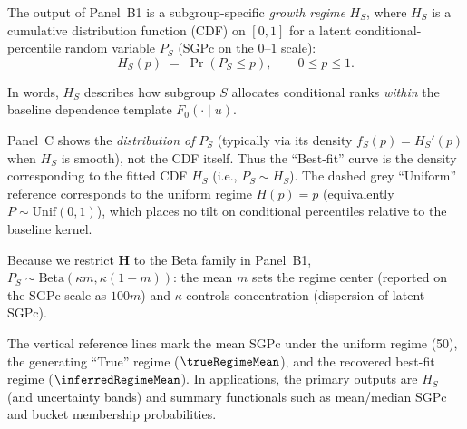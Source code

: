 \documentclass[10pt]{article}
\begin{document}
\noindent
\begin{minipage}[t]{3.75in}
  \vspace{0.05in}
  \hspace{0.15in}%
  \begin{minipage}{3.45in}
    \small\raggedright\color{bodyGrey}

    The output of Panel~B1 is a subgroup-specific \emph{growth regime} $H_S$, 
    where $H_S$ is a cumulative distribution function (CDF) on $[0,1]$ for a 
    latent conditional-percentile random variable $P_S$ (SGPc on the $0$--$1$ 
    scale):
    \[
      H_S(p)\;=\;\Pr(P_S \le p),\qquad 0\le p\le 1.
    \]
    
    \vspace{1pt}
    In words, $H_S$ describes how subgroup $S$ allocates conditional ranks 
    \emph{within} the baseline dependence template $F_0(\cdot\mid u)$.
    
    \vspace{4pt}
    Panel~C shows the \emph{distribution of} $P_S$ (typically via its density 
    $f_S(p)=H_S'(p)$ when $H_S$ is smooth), not the CDF itself. Thus the ``Best-fit'' 
    curve is the density corresponding to the fitted CDF $H_S$ (i.e., $P_S\sim H_S$).
    The dashed grey ``Uniform'' reference corresponds to the uniform regime $H(p)=p$ 
    (equivalently $P\sim\mathrm{Unif}(0,1)$), which places no tilt on conditional 
    percentiles relative to the baseline kernel.
    
    \vspace{4pt}
    Because we restrict $\mathbold{H}$ to the Beta family in Panel~B1, 
    $P_S\sim\mathrm{Beta}(\kappa m,\kappa(1-m))$: the mean $m$ sets the 
    regime center (reported on the SGPc scale as $100m$) and $\kappa$ 
    controls concentration (dispersion of latent SGPc).

    \vspace{4pt}
    The vertical reference lines mark the mean SGPc under the uniform 
    regime (50), the generating ``True'' regime ($\trueRegimeMean$), and the recovered 
    best-fit regime ($\inferredRegimeMean$). In applications, the primary outputs are 
    $H_S$ (and uncertainty bands) and summary functionals such as mean/median 
    SGPc and bucket membership probabilities.

  \end{minipage}
  \vspace{0.1in}
\end{minipage}
\end{document}

